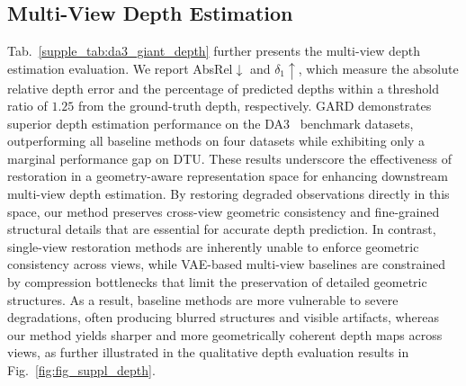 \subsection{Multi-View Depth Estimation}
Tab.~\ref{supple_tab:da3_giant_depth} further presents the multi-view depth estimation evaluation. We report AbsRel$\downarrow$ and $\delta_1\uparrow$, which measure the absolute relative depth error and the percentage of predicted depths within a threshold ratio of $1.25$ from the ground-truth depth, respectively. GARD demonstrates superior depth estimation performance on the DA3~\cite{depthanything3} benchmark datasets, outperforming all baseline methods on four datasets while exhibiting only a marginal performance gap on DTU. These results underscore the effectiveness of restoration in a geometry-aware representation space for enhancing downstream multi-view depth estimation. By restoring degraded observations directly in this space, our method preserves cross-view geometric consistency and fine-grained structural details that are essential for accurate depth prediction. In contrast, single-view restoration methods are inherently unable to enforce geometric consistency across views, while VAE-based multi-view baselines are constrained by compression bottlenecks that limit the preservation of detailed geometric structures. As a result, baseline methods are more vulnerable to severe degradations, often producing blurred structures and visible artifacts, whereas our method yields sharper and more geometrically coherent depth maps across views, as further illustrated in the qualitative depth evaluation results in Fig.~\ref{fig:fig_suppl_depth}.



